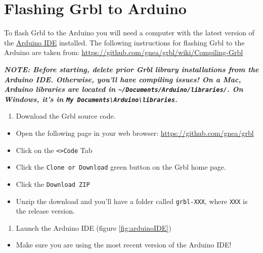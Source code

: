 \documentclass[]{book}
\providecommand{\tightlist}{%
  \setlength{\itemsep}{0pt}\setlength{\parskip}{0pt}}
\theoremstyle{definition}
\theoremstyle{definition}
\theoremstyle{remark}
\begin{document}
\section{Flashing Grbl to Arduino}\label{flashing-grbl-to-arduino}

To flash Grbl to the Arduino you will need a computer with the latest
version of the \href{https://www.arduino.cc/en/Main/Software}{Arduino
IDE} installed. The following instructions for flashing Grbl to the
Arduino are taken from:
\url{https://github.com/gnea/grbl/wiki/Compiling-Grbl}

\emph{\textbf{NOTE: Before starting, delete prior Grbl library
installations from the Arduino IDE. Otherwise, you'll have compiling
issues! On a Mac, Arduino libraries are located in
\texttt{\textasciitilde{}/Documents/Arduino/libraries/}. On Windows,
it's in
\texttt{My\ Documents\textbackslash{}Arduino\textbackslash{}libraries}.}}

\begin{enumerate}
\def\labelenumi{\arabic{enumi}.}
\tightlist
\item
  Download the Grbl source code.
\end{enumerate}

\begin{itemize}
\tightlist
\item
  Open the following page in your web browser:
  \url{https://github.com/gnea/grbl}
\item
  Click on the \texttt{\textless{}\textgreater{}Code} Tab
\item
  Click the \texttt{Clone\ or\ Download} green button on the Grbl home
  page.
\item
  Click the \texttt{Download\ ZIP}
\item
  Unzip the download and you'll have a folder called \texttt{grbl-XXX},
  where \texttt{XXX} is the release version.
\end{itemize}

\begin{enumerate}
\def\labelenumi{\arabic{enumi}.}
\setcounter{enumi}{1}
\tightlist
\item
  Launch the Arduino IDE (figure \ref{fig:arduinoIDE})
\end{enumerate}

\begin{itemize}
\tightlist
\item
  Make sure you are using the most recent version of the Arduino IDE!
\end{itemize}
\end{document}
